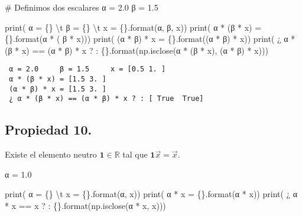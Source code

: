 \documentclass[
  letterpaper,
  DIV=11,
  numbers=noendperiod]{scrreprt}
\newenvironment{Shaded}{\begin{snugshade}}{\end{snugshade}}
\newcommand{\BuiltInTok}[1]{\textcolor[rgb]{0.00,0.23,0.31}{#1}}
\newcommand{\CharTok}[1]{\textcolor[rgb]{0.13,0.47,0.30}{#1}}
\newcommand{\CommentTok}[1]{\textcolor[rgb]{0.37,0.37,0.37}{#1}}
\newcommand{\FloatTok}[1]{\textcolor[rgb]{0.68,0.00,0.00}{#1}}
\newcommand{\NormalTok}[1]{\textcolor[rgb]{0.00,0.23,0.31}{#1}}
\newcommand{\OperatorTok}[1]{\textcolor[rgb]{0.37,0.37,0.37}{#1}}
\newcommand{\SpecialCharTok}[1]{\textcolor[rgb]{0.37,0.37,0.37}{#1}}
\newcommand{\StringTok}[1]{\textcolor[rgb]{0.13,0.47,0.30}{#1}}
\begin{document}
\begin{Shaded}
\begin{Highlighting}[]
\CommentTok{\# Definimos dos escalares}
\NormalTok{α }\OperatorTok{=} \FloatTok{2.0}
\NormalTok{β }\OperatorTok{=} \FloatTok{1.5}

\BuiltInTok{print}\NormalTok{(}\StringTok{\textquotesingle{} α = }\SpecialCharTok{\{\}}\StringTok{ }\CharTok{\textbackslash{}t}\StringTok{ β = }\SpecialCharTok{\{\}}\StringTok{ }\CharTok{\textbackslash{}t}\StringTok{ x = }\SpecialCharTok{\{\}}\StringTok{\textquotesingle{}}\NormalTok{.}\BuiltInTok{format}\NormalTok{(α, β, x))}
\BuiltInTok{print}\NormalTok{(}\StringTok{\textquotesingle{} α * (β * x) = }\SpecialCharTok{\{\}}\StringTok{\textquotesingle{}}\NormalTok{.}\BuiltInTok{format}\NormalTok{(α }\OperatorTok{*}\NormalTok{ ( β }\OperatorTok{*}\NormalTok{ x)))}
\BuiltInTok{print}\NormalTok{(}\StringTok{\textquotesingle{} (α * β) * x = }\SpecialCharTok{\{\}}\StringTok{\textquotesingle{}}\NormalTok{.}\BuiltInTok{format}\NormalTok{((α }\OperatorTok{*}\NormalTok{ β) }\OperatorTok{*}\NormalTok{ x))}
\BuiltInTok{print}\NormalTok{(}\StringTok{\textquotesingle{} ¿ α * (β * x) == (α * β) * x ? : }\SpecialCharTok{\{\}}\StringTok{\textquotesingle{}}\NormalTok{.}\BuiltInTok{format}\NormalTok{(np.isclose(α }\OperatorTok{*}\NormalTok{ (β }\OperatorTok{*}\NormalTok{ x), (α }\OperatorTok{*}\NormalTok{ β) }\OperatorTok{*}\NormalTok{ x)))}
\end{Highlighting}
\end{Shaded}

\begin{verbatim}
 α = 2.0     β = 1.5     x = [0.5 1. ]
 α * (β * x) = [1.5 3. ]
 (α * β) * x = [1.5 3. ]
 ¿ α * (β * x) == (α * β) * x ? : [ True  True]
\end{verbatim}

\subsection{Propiedad 10.}\label{propiedad-10.}

Existe el elemento neutro \(\mathbf{1} \in \mathbb{R}\) tal que
\(\mathbf{1} \vec{x} = \vec{x}\).

\begin{Shaded}
\begin{Highlighting}[]
\NormalTok{α }\OperatorTok{=} \FloatTok{1.0}

\BuiltInTok{print}\NormalTok{(}\StringTok{\textquotesingle{} α = }\SpecialCharTok{\{\}}\StringTok{ }\CharTok{\textbackslash{}t}\StringTok{ x = }\SpecialCharTok{\{\}}\StringTok{\textquotesingle{}}\NormalTok{.}\BuiltInTok{format}\NormalTok{(α, x))}
\BuiltInTok{print}\NormalTok{(}\StringTok{\textquotesingle{} α * x = }\SpecialCharTok{\{\}}\StringTok{\textquotesingle{}}\NormalTok{.}\BuiltInTok{format}\NormalTok{(α }\OperatorTok{*}\NormalTok{ x))}
\BuiltInTok{print}\NormalTok{(}\StringTok{\textquotesingle{} ¿ α * x == x ? : }\SpecialCharTok{\{\}}\StringTok{\textquotesingle{}}\NormalTok{.}\BuiltInTok{format}\NormalTok{(np.isclose(α }\OperatorTok{*}\NormalTok{ x, x)))}
\end{Highlighting}
\end{Shaded}
\end{document}
